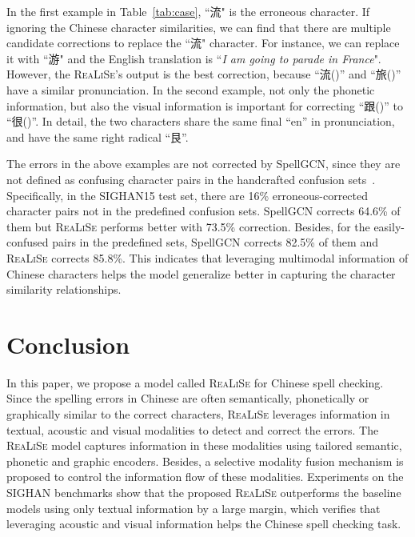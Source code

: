 \documentclass[11pt,a4paper]{article}
\newcommand\model{\textsc{ReaLiSe}}
\begin{document}
\begin{CJK*}{UTF8}{gbsn}

In the first example in Table~\ref{tab:case}, ``流" is the erroneous character. If ignoring the Chinese character similarities, we can find that there are multiple candidate corrections to replace the ``流" character. For instance, we can replace it with ``游" and the English translation is ``\textit{I am going to parade in France}". However, the \model{}'s output is the best correction, because ``流()'' and ``旅()'' have a similar pronunciation. In the second example, not only the phonetic information, but also the visual information is important for correcting ``跟()'' to ``很()''.
In detail, the two characters share the same final ``en'' in pronunciation, and have the same right radical ``艮''. 

The errors in the above examples are not corrected by SpellGCN, since they are not defined as confusing character pairs in the handcrafted confusion sets~\cite{conf}.
Specifically, in the SIGHAN15 test set, there are 16\% erroneous-corrected character pairs not in the predefined confusion sets. SpellGCN corrects 64.6\% of them but \model{} performs better with 73.5\% correction. Besides, for the easily-confused pairs in the predefined sets, SpellGCN corrects 82.5\% of them and \model{} corrects 85.8\%.
This indicates that leveraging multimodal information of Chinese characters helps the model generalize better in capturing the character similarity relationships.


\end{CJK*}

\section{Conclusion}
In this paper, we propose a model called \model{} for Chinese spell checking.
Since the spelling errors in Chinese are often semantically, phonetically or graphically similar to the correct characters, \model{} leverages information in textual, acoustic and visual modalities to detect and correct the errors.
The \model{} model captures information in these modalities using tailored semantic, phonetic and graphic encoders.
Besides, a selective modality fusion mechanism is proposed to control the information flow of these modalities.
Experiments on the SIGHAN benchmarks show that the proposed \model{} outperforms the baseline models using only textual information by a large margin, which verifies that leveraging acoustic and visual information helps the Chinese spell checking task.
\end{document}
